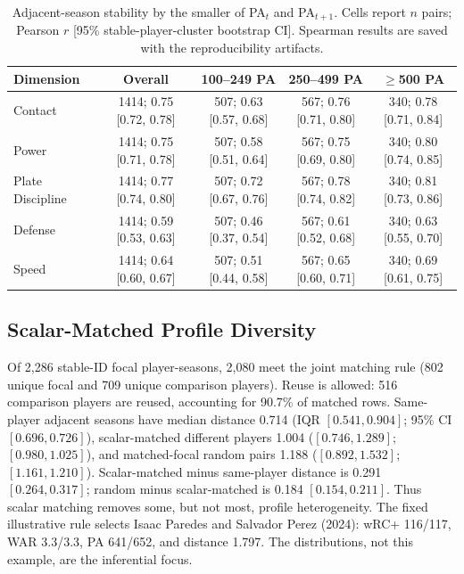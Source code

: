 \documentclass[10pt,twocolumn,letterpaper]{article}
\begin{document}
\begin{table}[t]
\centering
\caption{Adjacent-season stability by the smaller of PA$_t$ and PA$_{t+1}$. Cells report $n$ pairs; Pearson $r$ [95\% stable-player-cluster bootstrap CI]. Spearman results are saved with the reproducibility artifacts.}
\label{tab:stability}
\scriptsize
\setlength{\tabcolsep}{3.5pt}
\begin{tabular}{lcccc}
\toprule
Dimension & Overall & 100--249 PA & 250--499 PA & $\geq$500 PA \\
\midrule
Contact & 1414; 0.75 [0.72, 0.78] & 507; 0.63 [0.57, 0.68] & 567; 0.76 [0.71, 0.80] & 340; 0.78 [0.71, 0.84] \\
Power & 1414; 0.75 [0.71, 0.78] & 507; 0.58 [0.51, 0.64] & 567; 0.75 [0.69, 0.80] & 340; 0.80 [0.74, 0.85] \\
Plate Discipline & 1414; 0.77 [0.74, 0.80] & 507; 0.72 [0.67, 0.76] & 567; 0.78 [0.74, 0.82] & 340; 0.81 [0.73, 0.86] \\
Defense & 1414; 0.59 [0.53, 0.63] & 507; 0.46 [0.37, 0.54] & 567; 0.61 [0.52, 0.68] & 340; 0.63 [0.55, 0.70] \\
Speed & 1414; 0.64 [0.60, 0.67] & 507; 0.51 [0.44, 0.58] & 567; 0.65 [0.60, 0.71] & 340; 0.69 [0.61, 0.75] \\
\bottomrule
\end{tabular}
\end{table}

\subsection{Scalar-Matched Profile Diversity}
\label{sec:matched-profile}
Of 2{,}286 stable-ID focal player-seasons, 2{,}080 meet the joint matching rule (802 unique focal and 709 unique comparison players). Reuse is allowed: 516 comparison players are reused, accounting for 90.7\% of matched rows. Same-player adjacent seasons have median distance 0.714 (IQR $[0.541,0.904]$; 95\% CI $[0.696,0.726]$), scalar-matched different players 1.004 ($[0.746,1.289]$; $[0.980,1.025]$), and matched-focal random pairs 1.188 ($[0.892,1.532]$; $[1.161,1.210]$). Scalar-matched minus same-player distance is 0.291 $[0.264,0.317]$; random minus scalar-matched is 0.184 $[0.154,0.211]$. Thus scalar matching removes some, but not most, profile heterogeneity. The fixed illustrative rule selects Isaac Paredes and Salvador Perez (2024): wRC+ 116/117, WAR 3.3/3.3, PA 641/652, and distance 1.797. The distributions, not this example, are the inferential focus.
\end{document}
